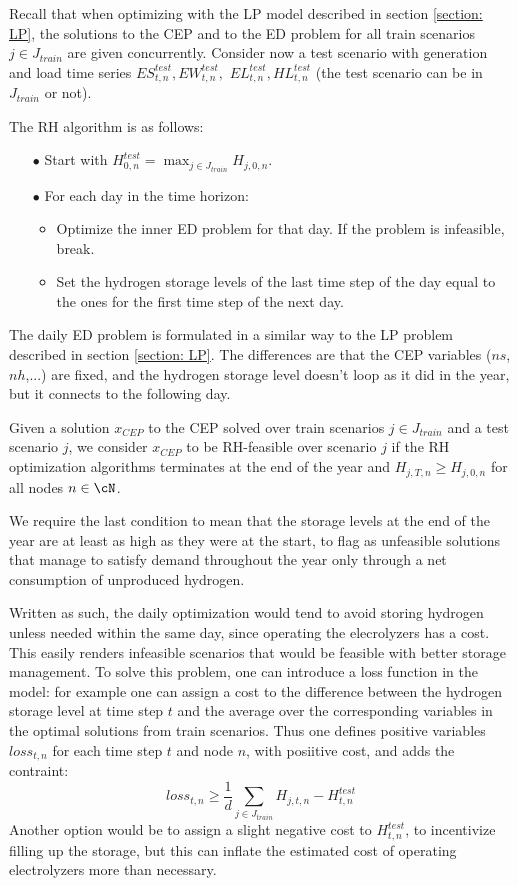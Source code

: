 Recall that when optimizing with the LP model described in section \ref{section: LP}, the solutions to the CEP and to the ED problem for all train scenarios $j\in J_{train}$ are given concurrently. 
Consider now a test scenario with generation and load time series $ES^{test}_{t,n}, EW^{test}_{t,n},$ $EL^{test}_{t,n}, HL^{test}_{t,n}$ (the test scenario can be in $J_{train}$ or not).

The RH algorithm is as follows:
\begin{itemize}
\item[$\bullet$] Start with $H_{0,n}^{test} = \max_{j\in J_{train}} H_{j,0,n}$.
\item[$\bullet$] For each day in the time horizon:
\begin{itemize}
\item Optimize the inner ED problem for that day. If the problem is infeasible, break.
\item Set the hydrogen storage levels of the last time step of the day equal to the ones for the first time step of the next day.
\end{itemize}
\end{itemize}

The daily ED problem is formulated in a similar way to the LP problem described in section \ref{section: LP}. 
The differences are that the CEP variables ($ns$, $nh$,...) are fixed, and the hydrogen storage level doesn't loop as it did in the year, but it connects to the following day.

\begin{definition}[RH-feasibility]
  Given a solution $x_{CEP}$ to the CEP solved over train scenarios $j\in J_{train}$ and a test scenario $j$, we consider $x_{CEP}$ to be RH-feasible over scenario $j$ if the RH optimization algorithms terminates at the end of the year and $H_{j,T,n}\ge H_{j,0,n}$ for all nodes $n\in\cN$.
  \end{definition}
We require the last condition to mean that the storage levels at the end of the year are at least as high as they were at the start, to flag as unfeasible solutions that manage to satisfy demand throughout the year only through a net consumption of unproduced hydrogen.
  
Written as such, the daily optimization would tend to avoid storing hydrogen unless needed within the same day, since operating the elecrolyzers has a cost. 
This easily renders infeasible scenarios that would be feasible with better storage management. 
To solve this problem, one can introduce a loss function in the model: for example one can assign a cost to the difference between the hydrogen storage level at time step $t$ and the average over the corresponding variables in the optimal solutions from train scenarios. 
Thus one defines positive variables $loss_{t,n}$ for each time step $t$ and node $n$, with posiitive cost, and adds the contraint:
\begin{equation}
loss_{t,n} \ge \frac{1}{d}\sum_{j\in J_{train}} H_{j,t,n} - H^{test}_{t,n} 
\end{equation}
Another option would be to assign a slight negative cost to $H^{test}_{t,n}$, to incentivize filling up the storage, but this can inflate the estimated cost of operating electrolyzers more than necessary.


